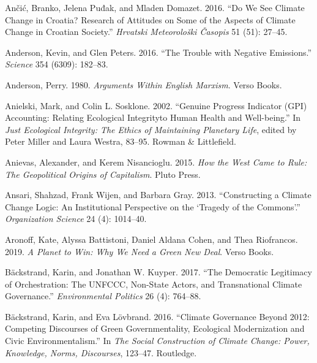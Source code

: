 \documentclass[a4paper, nobind]{templates/ociamthesis}
\newlength{\cslhangindent}
\newenvironment{CSLReferences}[2] %
 {%
  \setlength{\parindent}{0pt}
  \ifodd #1
  \let\oldpar\par
  \def\par{\hangindent=\cslhangindent\oldpar}
  \fi
  \setlength{\parskip}{1mm}
  \setlength{\baselineskip}{6mm}
 }%
 {}
\begin{document}
\begin{CSLReferences}{1}{0}
\leavevmode{}%
Ančić, Branko, Jelena Puđak, and Mladen Domazet. 2016. {``Do We See Climate Change in {Croatia}? {Research} of Attitudes on Some of the Aspects of Climate Change in {Croatian} Society.''} \emph{Hrvatski Meteorološki Časopis} 51 (51): 27--45.

\leavevmode{}%
Anderson, Kevin, and Glen Peters. 2016. {``The Trouble with Negative Emissions.''} \emph{Science} 354 (6309): 182--83.

\leavevmode{}%
Anderson, Perry. 1980. \emph{Arguments {Within English Marxism}}. {Verso Books}.

\leavevmode{}%
Anielski, Mark, and Colin L. Sosklone. 2002. {``Genuine {Progress Indicator} ({GPI}) {Accounting}: {Relating Ecological Integrityto Human Health} and {Well-being}.''} In \emph{Just {Ecological Integrity}: {The Ethics} of {Maintaining Planetary Life}}, edited by Peter Miller and Laura Westra, 83--95. {Rowman \& Littlefield}.

\leavevmode{}%
Anievas, Alexander, and Kerem Nisancioglu. 2015. \emph{How the {West Came} to {Rule}: {The Geopolitical Origins} of {Capitalism}}. {Pluto Press}.

\leavevmode{}%
Ansari, Shahzad, Frank Wijen, and Barbara Gray. 2013. {``Constructing a Climate Change Logic: {An} Institutional Perspective on the {`Tragedy of the Commons'}.''} \emph{Organization Science} 24 (4): 1014--40.

\leavevmode{}%
Aronoff, Kate, Alyssa Battistoni, Daniel Aldana Cohen, and Thea Riofrancos. 2019. \emph{A {Planet} to {Win}: {Why We Need} a {Green New Deal}}. {Verso Books}.

\leavevmode{}%
Bäckstrand, Karin, and Jonathan W. Kuyper. 2017. {``The Democratic Legitimacy of Orchestration: The {UNFCCC}, Non-State Actors, and Transnational Climate Governance.''} \emph{Environmental Politics} 26 (4): 764--88.

\leavevmode{}%
Bäckstrand, Karin, and Eva Lövbrand. 2016. {``Climate Governance Beyond 2012: Competing Discourses of Green Governmentality, Ecological Modernization and Civic Environmentalism.''} In \emph{The Social Construction of Climate Change: {Power}, Knowledge, Norms, Discourses}, 123--47. {Routledge}.


\end{CSLReferences}
\end{document}
